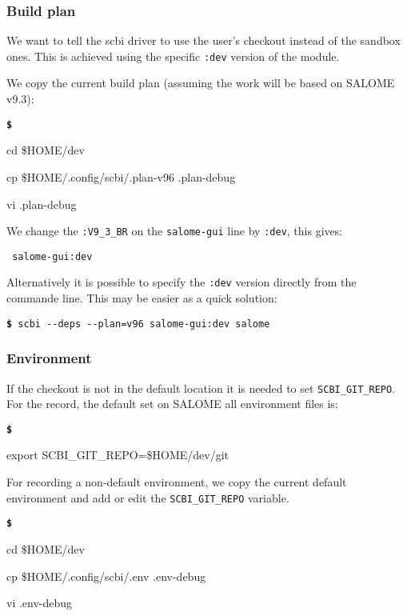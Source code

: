 \documentclass[a4paper,12pt,twoside]{article}
\newenvironment{shellcommand}{
	\begin{list}{ %
			\bfseries\texttt \$
		}{ %
			\ttfamily
			\setlength{\topsep}{-0.3ex}
			\setlength{\labelwidth}{1in}
			\setlength{\leftmargin}{0.7in}
			\setlength{\labelsep}{0.5ex}
			\setlength{\rightmargin}{0.5in}
			\setlength{\itemsep}{1ex}
			\setlength{\parsep}{0ex}
			\setlength{\listparindent}{0.5in}
		}
	}{
	\end{list}
}
\newcommand{\code}[1]{\texttt{#1}}
\newcommand{\cmd}[1]{\tabto{1cm}\hspace{0.5cm}\texttt{\textbf{\$} #1}}
\newcommand{\ddash}{-{}-}
\begin{document}
\subsubsection{Build plan}

We want to tell the scbi driver to use the user's checkout instead of the sandbox ones. This is achieved using the specific \code{:dev} version of the module.

We copy the current build plan (assuming the work will be based on SALOME v9.3):

\begin{shellcommand}
	\item cd \$HOME/dev
	\item cp \$HOME/.config/scbi/.plan-v96 .plan-debug
	\item vi .plan-debug
\end{shellcommand}

We change the \code{:V9\_3\_BR} on the \code{salome-gui} line by \code{:dev}, this gives:

\begin{lstlisting}
 salome-gui:dev
\end{lstlisting}

Alternatively it is possible to specify the \code{:dev} version directly from the commande line. This may be easier as a quick solution:

\cmd{scbi \ddash{}deps \ddash{}plan=v96 salome-gui:dev salome}

\subsubsection{Environment}

If the checkout is not in the default location it is needed to set \code{SCBI\_GIT\_REPO}. For the record, the default set on SALOME all environment files is:

\begin{shellcommand}
	\item export SCBI\_GIT\_REPO=\$HOME/dev/git
\end{shellcommand}

For recording a non-default environment, we copy the current default environment and add or edit the \code{SCBI\_GIT\_REPO} variable.

\begin{shellcommand}
	\item cd \$HOME/dev
	\item cp \$HOME/.config/scbi/.env .env-debug
	\item vi .env-debug
\end{shellcommand}
\end{document}
